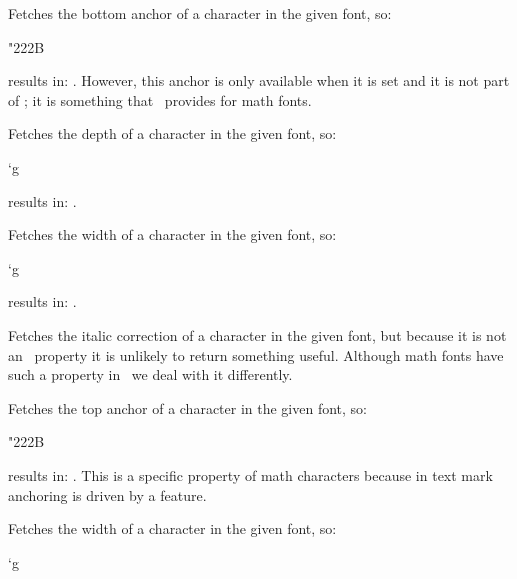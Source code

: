 \stopoldprimitive

\startnewprimitive[title={\prm {fontcharba}}]

Fetches the bottom anchor of a character in the given font, so:

\startbuffer
\the\fontcharba{} "222B
\stopbuffer

results in: \inlinebuffer. However, this anchor is only available when it is set
and it is not part of \OPENTYPE; it is something that \CONTEXT\ provides for math
fonts.

\stopnewprimitive

\startoldprimitive[title={\prm {fontchardp}}]

Fetches the depth of a character in the given font, so:

\startbuffer
\the\fontchardp\font`g
\stopbuffer

results in: \inlinebuffer.

\stopoldprimitive

\startoldprimitive[title={\prm {fontcharht}}]

Fetches the width of a character in the given font, so:

\startbuffer
\the\fontcharht\font`g
\stopbuffer

results in: \inlinebuffer.

\stopoldprimitive

\startoldprimitive[title={\prm {fontcharic}}]

Fetches the italic correction of a character in the given font, but because it is
not an \OPENTYPE\ property it is unlikely to return something useful. Although
math fonts have such a property in \CONTEXT\ we deal with it differently.

\stopoldprimitive

\startnewprimitive[title={\prm {fontcharta}}]

Fetches the top anchor of a character in the given font, so:

\startbuffer
\the\fontcharba{} "222B
\stopbuffer

results in: \inlinebuffer. This is a specific property of math characters because
in text mark anchoring is driven by a feature.

\stopnewprimitive

\startoldprimitive[title={\prm {fontcharwd}}]

Fetches the width of a character in the given font, so:

\startbuffer
\the\fontcharwd\font`g
\stopbuffer

